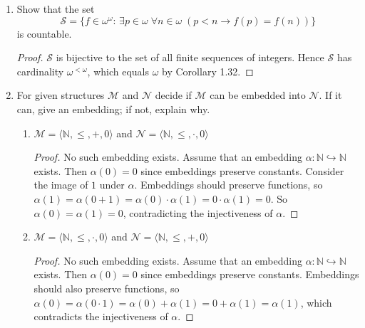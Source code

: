 \documentclass{article}
\begin{document}
\begin{enumerate}
\begin{proof}
      \begin{enumerate}
        \item Let $g_0$ be the sequence of $0$'s of length $f(0)$.
        \item Given $g_n$, let $g_{n+1}$ be $g_n$ concatenated with a
          sequence of bits of length $f(n+1)-f(n)$, where we choose the bit
          to be 0 if $n+1$ is even and 1 if $n+1$ is odd.
      \end{enumerate}

      It is routine to verify that $\theta$ is a bijection, hence
      $\mathcal{S}$ has the same cardinality as $2^\omega$. 
    \end{proof}

  \item Show that the set
    \begin{equation*}
      \mathcal{S}=\{f\in\omega^\omega:\, \exists p\in\omega\; \forall
      n\in\omega\; (p<n\rightarrow f(p)=f(n))\}
    \end{equation*}
    is countable.

    \begin{proof}
      $\mathcal{S}$ is bijective to the set of all finite sequences of
      integers. Hence $\mathcal{S}$ has cardinality $\omega^{<\omega}$,
      which equals $\omega$ by Corollary 1.32.
    \end{proof}

  \item For given structures $\mathcal{M}$ and $\mathcal{N}$ decide if
    $\mathcal{M}$ can be embedded into $\mathcal{N}$. If it can, give an
    embedding; if not, explain why.

    \begin{enumerate}
      \item $\mathcal{M}=\langle\mathbb{N},\leq,+,0\rangle$ and
        $\mathcal{N}=\langle\mathbb{N},\leq,\cdot,0\rangle$
        \begin{proof}
          No such embedding exists. Assume that an embedding
          $\alpha:\mathbb{N}\hookrightarrow\mathbb{N}$ exists. Then
          $\alpha(0)=0$ since embeddings preserve constants. Consider the
          image of $1$ under $\alpha$. Embeddings should preserve
          functions, so
          $\alpha(1)=\alpha(0+1)=\alpha(0)\cdot\alpha(1)=0\cdot\alpha(1)=0$.
          So $\alpha(0)=\alpha(1)=0$, contradicting the injectiveness of
          $\alpha$.
        \end{proof}

      \item $\mathcal{M}=\langle\mathbb{N},\leq,\cdot,0\rangle$ and
        $\mathcal{N}=\langle\mathbb{N},\leq,+,0\rangle$
        \begin{proof}
          No such embedding exists. Assume that an embedding
          $\alpha:\mathbb{N}\hookrightarrow\mathbb{N}$ exists. Then
          $\alpha(0)=0$ since embeddings preserve constants. Embeddings
          should also preserve functions, so
          $\alpha(0)=\alpha(0\cdot1)=\alpha(0)+\alpha(1)=0+\alpha(1)=\alpha(1)$,
          which contradicts the injectiveness of $\alpha$.
        \end{proof}


\end{enumerate}
\end{enumerate}
\end{document}

